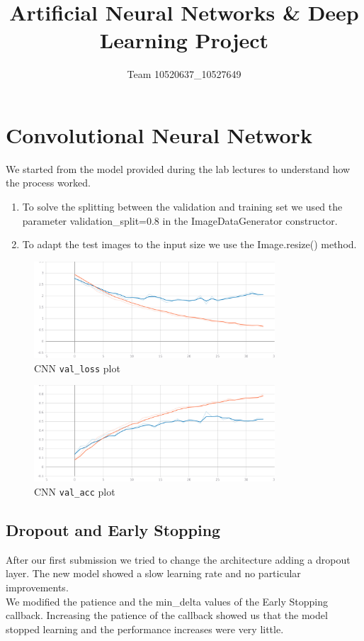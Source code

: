 \documentclass{article}
\title{Artificial Neural Networks \& Deep Learning Project}
\author{Team 10520637\_10527649}
\begin{document}
	
	\maketitle

	\section{Convolutional Neural Network}
	
	We started from the model provided during the lab lectures to understand how the process worked.
	
	\begin{enumerate}
		\item To solve the splitting between the validation and training set we used the parameter validation\_split=0.8 in the ImageDataGenerator constructor.
		\item To adapt the test images to the input size we use the Image.resize() method.
	\end{enumerate}	
	
	\begin{figure}[H]
		\centering
			\includegraphics[width=9cm, keepaspectratio]{CNN_LOSS.jpg}
			\caption{CNN \texttt{val\_loss} plot}
	\end{figure}
	
	\begin{figure}[H]
		\centering
			\includegraphics[width=9cm, keepaspectratio]{CNN_ACC.jpg}
			\caption{CNN \texttt{val\_acc} plot}
	\end{figure}
		
	
	\subsection{Dropout and Early Stopping}
	After our first submission we tried to change the architecture adding a dropout layer. The new model showed a slow learning rate and no particular improvements. \\
	We modified the patience and the min\_delta values of the Early Stopping callback. Increasing the patience of the callback showed us that the model stopped learning and the performance increases were very little.
	
\end{document}
